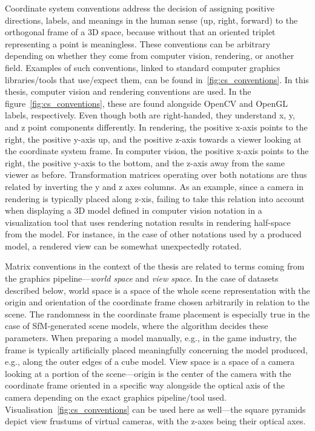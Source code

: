 Coordinate system conventions address the decision of assigning positive directions,
labels, and meanings in the human sense (up, right, forward) to the orthogonal frame of a
3D space, because without that an oriented triplet representing a point is meaningless.
These conventions can be arbitrary depending on whether they come from computer vision,
rendering, or another field. Examples of such conventions, linked to standard computer
graphics libraries/tools that use/expect them, can be found in~\cref{fig:cs_conventions}.
In this thesis, computer vision and rendering conventions are used. In the
figure~\cref{fig:cs_conventions}, these are found alongside OpenCV and OpenGL labels,
respectively. Even though both are right-handed, they understand x, y, and z point
components differently.  In rendering, the positive x-axis points to the right, the
positive y-axis up, and the positive z-axis towards a viewer looking at the coordinate
system frame. In computer vision, the positive x-axis points to the right, the positive
y-axis to the bottom, and the z-axis away from the same viewer as before. Transformation
matrices operating over both notations are thus related by inverting the y and z axes
columns. As an example, since a camera in rendering is typically placed along z-xis,
failing to take this relation into account when displaying a 3D model defined in computer
vision notation in a visualization tool that uses rendering notation results in rendering
half-space  from the model. For instance, in the case of other notations used by
a produced model, a rendered view can be somewhat unexpectedly rotated.

Matrix conventions in the context of the thesis are related to terms coming from the
graphics pipeline---\emph{world space} and \emph{view space}. In the case of datasets
described below, world space is a space of the whole scene representation with the origin
and orientation of the coordinate frame chosen arbitrarily in relation to the scene.  The
randomness in the coordinate frame placement is especially true in the case of
SfM-generated scene models, where the algorithm decides these parameters.  When preparing
a model manually, e.g., in the game industry, the frame is typically artificially placed
meaningfully concerning the model produced, e.g., along the outer edges of a cube model.
View space is a space of a camera looking at a portion of the scene---origin is the center
of the camera with the coordinate frame oriented in a specific way alongside the optical
axis of the camera depending on the exact graphics pipeline/tool used.
Visualisation~\cref{fig:cs_conventions} can be used here as well---the square pyramids
depict view frustums of virtual cameras, with the z-axes being their optical axes.

